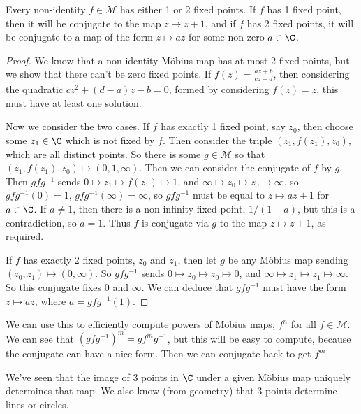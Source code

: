 \begin{theorem}
	Every non-identity $f \in \mathcal{M}$ has either 1 or 2 fixed points. If $f$ has 1 fixed point, then it will be conjugate to the map $z \mapsto z + 1$, and if $f$ has 2 fixed points, it will be conjugate to a map of the form $z \mapsto az$ for some non-zero $a \in \C$.
\end{theorem}
\begin{proof}
	We know that a non-identity Möbius map has at most 2 fixed points, but we show that there can't be zero fixed points. If $f(z) = \frac{az + b}{cz + d}$, then considering the quadratic $cz^2 + (d - a)z - b = 0$, formed by considering $f(z) = z$, this must have at least one solution.

	Now we consider the two cases. If $f$ has exactly 1 fixed point, say $z_0$, then choose some $z_1 \in \C$ which is not fixed by $f$. Then consider the triple $(z_1, f(z_1), z_0)$, which are all distinct points.  So there is some $g \in \mathcal{M}$ so that $(z_1, f(z_1), z_0) \mapsto (0, 1, \infty)$.
	Then we can consider the conjugate of $f$ by $g$. Then $gfg^{-1}$ sends $0 \mapsto z_1 \mapsto f(z_1) \mapsto 1$, and $\infty \mapsto z_0 \mapsto z_0 \mapsto \infty$, so $gfg^{-1}(0) = 1$, $gfg^{-1}(\infty) = \infty$, so $gfg^{-1}$ must be equal to $z \mapsto az + 1$ for $a \in \C$. If $a \neq 1$, then there is a non-infinity fixed point, $1/(1 - a)$, but this is a contradiction, so $a = 1$. Thus $f$ is conjugate via $g$ to the map $z \mapsto z + 1$, as required.

	If $f$ has exactly 2 fixed points, $z_0$ and $z_1$, then let $g$ be any Möbius map sending $(z_0, z_1) \mapsto (0, \infty)$. So $gfg^{-1}$ sends $0 \mapsto z_0 \mapsto z_0 \mapsto 0$, and $\infty \mapsto z_1 \mapsto z_1 \mapsto \infty$. So this conjugate fixes $0$ and $\infty$. We can deduce that $gfg^{-1}$ must have the form $z \mapsto az$, where $a = gfg^{-1}(1)$.
\end{proof}

We can use this to efficiently compute powers of Möbius maps, $f^n$ for all $f \in \mathcal{M}$. 
We can see that $(gfg^{-1})^m = gf^m g^{-1}$, but this will be easy to compute, because the conjugate can have a nice form. Then we can conjugate back to get $f^m$.



We've seen that the image of 3 points in $\C$ under a given Möbius map uniquely determines that map. We also know (from geometry) that 3 points determine lines or circles. 

